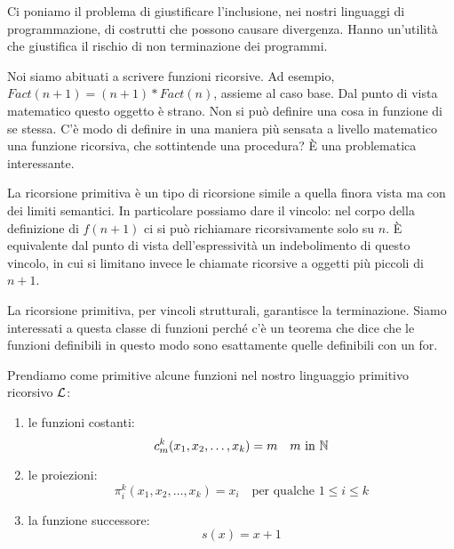 Ci poniamo il problema di giustificare l'inclusione, nei nostri linguaggi di programmazione, di
costrutti che possono causare divergenza. Hanno un'utilità che giustifica il rischio di non
terminazione dei programmi.

Noi siamo abituati a scrivere funzioni ricorsive. Ad esempio, $\textit{Fact}(n+1) =
(n+1)*\textit{Fact}(n)$, assieme al caso base. Dal punto di vista matematico questo oggetto è
strano. Non si può definire una cosa in funzione di se stessa. C'è modo di definire in una maniera
più sensata a livello matematico una funzione ricorsiva, che sottintende una procedura? È una
problematica interessante.

La ricorsione primitiva è un tipo di ricorsione simile a quella finora vista ma con dei limiti
semantici. In particolare possiamo dare il vincolo: nel corpo della definizione di $f(n+1)$ ci si
può richiamare ricorsivamente solo su $n$. È equivalente dal punto di vista dell'espressività un
indebolimento di questo vincolo, in cui si limitano invece le chiamate ricorsive a oggetti più
piccoli di $n+1$.

La ricorsione primitiva, per vincoli strutturali, garantisce la terminazione. Siamo interessati a
questa classe di funzioni perché c'è un teorema che dice che le funzioni definibili in questo modo
sono esattamente quelle definibili con un for.

Prendiamo come primitive alcune funzioni nel nostro linguaggio primitivo ricorsivo $\mathcal{L}$:
\begin{enumerate}
    \item le funzioni costanti:
        \begin{equation*}
            c^{k}_{m}(x_{1},x_{2},\dotsc,x_{k}) = m \quad \text{$m$ in $\mathbb{N}$}
        \end{equation*}
    \item le proiezioni:
        \begin{equation*}
            \pi_{i}^{k}(x_{1},x_{2},\dotsc,x_{k}) = x_{i} \quad \text{per qualche $1 \leq i \leq k$}
        \end{equation*}
    \item la funzione successore:
        \begin{equation*}
            s(x) = x + 1
        \end{equation*}
\end{enumerate}


